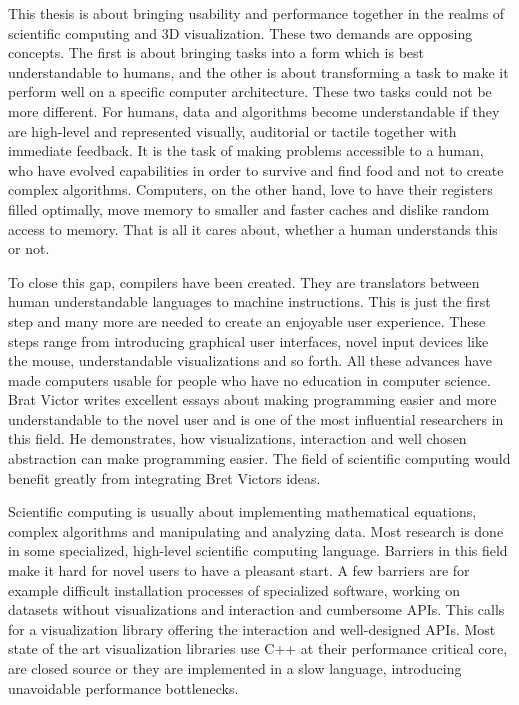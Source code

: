 This thesis is about bringing usability and performance together in the realms of scientific computing and 3D visualization.
These two demands are opposing concepts.
The first is about bringing tasks into a form which is best understandable to humans, and the other is about transforming a task to make it perform well on a specific computer architecture.
These two tasks could not be more different. 
For humans, data and algorithms become understandable if they are high-level and represented visually, auditorial or tactile together with immediate feedback. 
It is the task of making problems accessible to a human, who have evolved capabilities in order to survive and find food and not to create complex algorithms.
Computers, on the other hand, love to have their registers filled optimally, move memory to smaller and faster caches and dislike random access to memory. That is all it cares about, whether a human understands this or not.

To close this gap, compilers have been created. They are translators between human understandable languages to machine instructions.
This is just the first step and many more are needed to create an enjoyable user experience.
These steps range from introducing graphical user interfaces, novel input devices like the mouse, understandable visualizations and so forth.
All these advances have made computers usable for people who have no education in computer science.
Brat Victor writes excellent essays about making programming easier and more understandable to the novel user and is one of the most influential researchers in this field.
He demonstrates, how visualizations, interaction and well chosen abstraction can make programming easier\cite{BretVictorLP}\cite{BretVictorLA}.
The field of scientific computing would benefit greatly from integrating Bret Victors ideas.

Scientific computing is usually about implementing mathematical equations, complex algorithms and manipulating and analyzing data.
Most research is done in some specialized, high-level scientific computing language\cite{DBLP:journals/corr/abs-1209-5145}.
Barriers in this field make it hard for novel users to have a pleasant start.
A few barriers are for example difficult installation processes of specialized software, working on datasets without visualizations and interaction and cumbersome \ac{API}s.
This calls for a visualization library offering the interaction and well-designed \ac{API}s.
Most state of the art visualization libraries use C++ at their performance critical core, are closed source or they are implemented in a slow language, introducing unavoidable performance bottlenecks.

